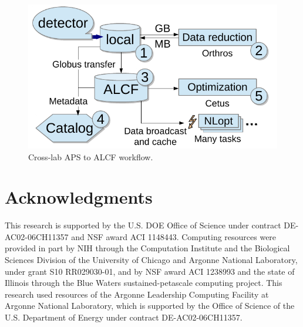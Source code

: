 \documentclass[conference,10pt]{IEEEtran}
\begin{document}
\begin{figure}
  \begin{center}
    \includegraphics[scale=0.58,clip=true,trim=0.05in -0.3in 0 0]
                    {img/NFHEDM.pdf}
    \caption{Cross-lab APS to ALCF workflow.
      \label{figure:nfhedm-workflow}}
  \end{center}
\end{figure}

\section*{Acknowledgments}

This research is supported by the U.S. DOE Office of Science under
contract DE-AC02-06CH11357 and NSF award ACI 1148443.  Computing
resources were provided in part by NIH through the Computation
Institute and the Biological Sciences Division of the University of
Chicago and Argonne National Laboratory, under grant S10 RR029030-01,
and by NSF award ACI 1238993 and the state of Illinois through the
Blue Waters sustained-petascale computing project. This research used
resources of the Argonne Leadership Computing Facility at Argonne
National Laboratory, which is supported by the Office of Science of
the U.S. Department of Energy under contract DE-AC02-06CH11357.

\end{document}
